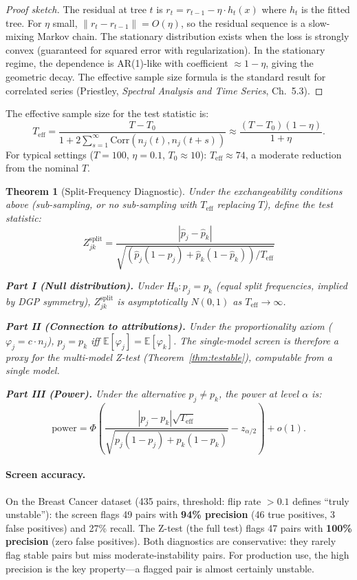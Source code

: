 \documentclass{article}
\newtheorem{theorem}{Theorem}
\newcommand{\E}{\mathbb{E}}
\begin{document}
\begin{proof}[Proof sketch]
The residual at tree $t$ is $r_t = r_{t-1} - \eta \cdot h_t(x)$ where $h_t$ is the fitted tree. For $\eta$ small, $\|r_t - r_{t-1}\| = O(\eta)$, so the residual sequence is a slow-mixing Markov chain. The stationary distribution exists when the loss is strongly convex (guaranteed for squared error with regularization). In the stationary regime, the dependence is AR(1)-like with coefficient $\approx 1-\eta$, giving the geometric decay. The effective sample size formula is the standard result for correlated series (Priestley, \emph{Spectral Analysis and Time Series}, Ch.~5.3).
\end{proof}

The effective sample size for the test statistic is:
\[
    T_{\text{eff}} = \frac{T - T_0}{1 + 2\sum_{s=1}^\infty \text{Corr}(n_j(t), n_j(t+s))} \approx \frac{(T - T_0)(1 - \eta)}{1 + \eta}.
\]
For typical settings ($T = 100$, $\eta = 0.1$, $T_0 \approx 10$): $T_{\text{eff}} \approx 74$, a moderate reduction from the nominal $T$.

\begin{theorem}[Split-Frequency Diagnostic]
\label{thm:split-diagnostic}
Under the exchangeability conditions above (sub-sampling, or no sub-sampling with $T_{\text{eff}}$ replacing $T$), define the test statistic:
\[
    Z^{\text{split}}_{jk} = \frac{|\hat{p}_j - \hat{p}_k|}{\sqrt{(\hat{p}_j(1-\hat{p}_j) + \hat{p}_k(1-\hat{p}_k))/T_{\text{eff}}}}
\]

\textbf{Part I (Null distribution).} Under $H_0: p_j = p_k$ (equal split frequencies, implied by DGP symmetry), $Z^{\text{split}}_{jk}$ is asymptotically $N(0,1)$ as $T_{\text{eff}} \to \infty$.

\textbf{Part II (Connection to attributions).} Under the proportionality axiom ($\varphi_j = c \cdot n_j$), $p_j = p_k$ iff $\E[\varphi_j] = \E[\varphi_k]$. The single-model screen is therefore a proxy for the multi-model Z-test (Theorem~\ref{thm:testable}), computable from a single model.

\textbf{Part III (Power).} Under the alternative $p_j \neq p_k$, the power at level $\alpha$ is:
\[
    \text{power} = \Phi\!\left(\frac{|p_j - p_k|\sqrt{T_{\text{eff}}}}{\sqrt{p_j(1-p_j) + p_k(1-p_k)}} - z_{\alpha/2}\right) + o(1).
\]
\end{theorem}

\paragraph{Screen accuracy.}
On the Breast Cancer dataset (435 pairs, threshold: flip rate $> 0.1$ defines ``truly unstable''): the screen flags 49 pairs with \textbf{94\% precision} (46 true positives, 3 false positives) and 27\% recall. The Z-test (the full test) flags 47 pairs with \textbf{100\% precision} (zero false positives). Both diagnostics are conservative: they rarely flag stable pairs but miss moderate-instability pairs. For production use, the high precision is the key property---a flagged pair is almost certainly unstable.
\end{document}
